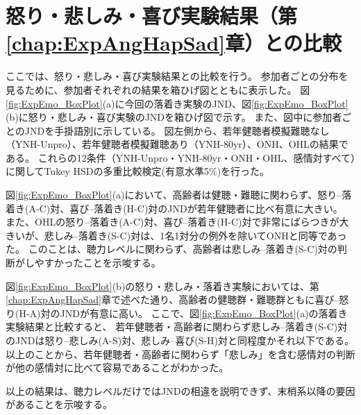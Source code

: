 





\clearpage
\section{怒り・悲しみ・喜び実験結果（第\ref{chap:ExpAngHapSad}章）との比較}
ここでは、怒り・悲しみ・喜び実験結果との比較を行う。
参加者ごとの分布を見るために、参加者それぞれの結果を箱ひげ図とともに表示した。
図\ref{fig:ExpEmo_BoxPlot}(a)に今回の落着き実験のJND、図\ref{fig:ExpEmo_BoxPlot}(b)に怒り・悲しみ・喜び実験のJNDを箱ひげ図で示す。
また、図中に参加者ごとのJNDを手掛語別に示している。
図左側から、若年健聴者模擬難聴なし（YNH-Unpro）、若年健聴者模擬難聴あり（YNH-80yr）、ONH、OHLの結果である。
これらの12条件（YNH-Unpro・YNH-80yr・ONH・OHL、感情対すべて）に関してTukey HSDの多重比較検定(有意水準5\%)を行った。

図\ref{fig:ExpEmo_BoxPlot}(a)において、高齢者は健聴・難聴に関わらず、怒り--落着き(A-C)対、喜び--落着き(H-C)対のJNDが若年健聴者に比べ有意に大きい。
また、OHLの怒り--落着き(A-C)対、喜び--落着き(H-C)対で非常にばらつきが大きいが、悲しみ--落着き(S-C)対は、1名1対分の例外を除いてONHと同等であった。
このことは、聴力レベルに関わらず、高齢者は悲しみ--落着き(S-C)対の判断がしやすかったことを示唆する。

図\ref{fig:ExpEmo_BoxPlot}(b)の怒り・悲しみ・落着き実験においては、第\ref{chap:ExpAngHapSad}章で述べた通り、高齢者の健聴群・難聴群ともに喜び--怒り(H-A)対のJNDが有意に高い。
ここで、図\ref{fig:ExpEmo_BoxPlot}(a)の落着き実験結果と比較すると、
若年健聴者・高齢者に関わらず悲しみ--落着き(S-C)対のJNDは怒り--悲しみ(A-S)対、悲しみ--喜び(S-H)対と同程度かそれ以下である。
以上のことから、若年健聴者・高齢者に関わらず「悲しみ」を含む感情対の判断が他の感情対に比べて容易であることがわかった。

以上の結果は、聴力レベルだけではJNDの相違を説明できず、末梢系以降の要因があることを示唆する。




